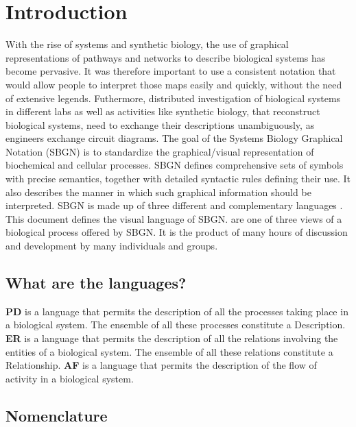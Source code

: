 

\chapter{Introduction}

With the rise of systems and synthetic biology, the use of graphical representations
of pathways and networks to describe biological systems has become pervasive. 
It was therefore important to use a consistent notation that would allow people 
to interpret those maps easily and quickly, without the need of extensive legends.
Futhermore, distributed investigation of biological systems in different labs as well
as activities like synthetic biology, that reconstruct biological systems, need
to exchange their descriptions unambiguously, as engineers exchange circuit diagrams.
The goal of the Systems Biology Graphical Notation (SBGN) is to standardize the 
graphical/visual representation of biochemical and cellular processes. SBGN 
defines comprehensive sets of symbols with precise semantics, together with 
detailed syntactic rules defining their use. It also describes the manner 
in which such graphical information should be interpreted.
SBGN is made up of three different and complementary languages \cite{Novere:2009p1}.
This document defines the \emph{\PD{}} visual language of SBGN. \PDs are 
one of three views of a biological process offered by SBGN. It is the 
product of many hours of discussion and development by many individuals and 
groups.

\section{What are the languages?}
\label{sec:what-languages}

\textbf{PD} is a language that permits the description of all the processes
taking place in a biological system. The ensemble of all these processes constitute
a Description. \textbf{ER} is a language that permits the description of all 
the relations involving the entities of a biological system. The ensemble of all 
these relations constitute a Relationship. \textbf{AF} is a language that permits the 
description of the flow of activity in a biological system.

\section{Nomenclature}
\label{sec:nomenclature}

